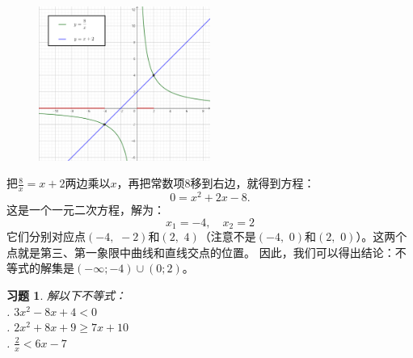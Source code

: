 \documentclass[12pt,UTF8]{ctexbook}
\newtheorem{xt}{习题}[section]
\begin{document}
\begin{figure}[h]
    \vspace{4pt}
    \centering
    \includegraphics[width=0.5\textwidth]{tu/一元二次不等式1.png}
\end{figure}

把$\frac{8}{x} = x + 2$两边乘以$x$，再把常数项$8$移到右边，就得到方程：
$$ 0 =  x^2 + 2x - 8.$$
这是一个一元二次方程，解为：
$$ x_1 = -4, \quad x_2 = 2$$
它们分别对应点$(-4, \,\,-2)$和$(2, \,\,4)$（注意不是$(-4, \,\,0)$和$(2, \,\,0)$）。这两个点就是第三、第一象限中曲线和直线交点的位置。
因此，我们可以得出结论：不等式的解集是$(-\infty; -4) \cup (0; 2)$。

\begin{xt}\label{xt:5-2-0}
    解以下不等式：\\
    . $3x^2 - 8x + 4 < 0$ \\
    . $2x^2 + 8x + 9 \geqslant 7x + 10$ \\
    . $\frac{2}{x} < 6x- 7$ 
\end{xt}
\end{document}
